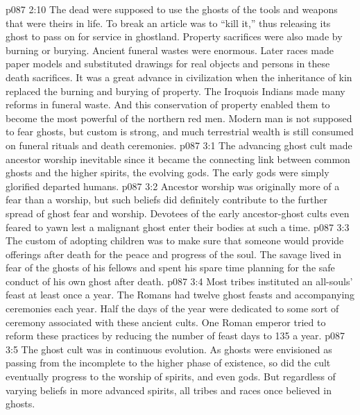 \vs p087 2:10 The dead were supposed to use the ghosts of the tools and weapons that were theirs in life. To break an article was to “kill it,” thus releasing its ghost to pass on for service in ghostland. Property sacrifices were also made by burning or burying. Ancient funeral wastes were enormous. Later races made paper models and substituted drawings for real objects and persons in these death sacrifices. It was a great advance in civilization when the inheritance of kin replaced the burning and burying of property. The Iroquois Indians made many reforms in funeral waste. And this conservation of property enabled them to become the most powerful of the northern red men. Modern man is not supposed to fear ghosts, but custom is strong, and much terrestrial wealth is still consumed on funeral rituals and death ceremonies.
\vs p087 3:1 The advancing ghost cult made ancestor worship inevitable since it became the connecting link between common ghosts and the higher spirits, the evolving gods. The early gods were simply glorified departed humans.
\vs p087 3:2 Ancestor worship was originally more of a fear than a worship, but such beliefs did definitely contribute to the further spread of ghost fear and worship. Devotees of the early ancestor\hyp{}ghost cults even feared to yawn lest a malignant ghost enter their bodies at such a time.
\vs p087 3:3 The custom of adopting children was to make sure that someone would provide offerings after death for the peace and progress of the soul. The savage lived in fear of the ghosts of his fellows and spent his spare time planning for the safe conduct of his own ghost after death.
\vs p087 3:4 Most tribes instituted an all\hyp{}souls’ feast at least once a year. The Romans had twelve ghost feasts and accompanying ceremonies each year. Half the days of the year were dedicated to some sort of ceremony associated with these ancient cults. One Roman emperor tried to reform these practices by reducing the number of feast days to 135 a year.
\vs p087 3:5 \pc The ghost cult was in continuous evolution. As ghosts were envisioned as passing from the incomplete to the higher phase of existence, so did the cult eventually progress to the worship of spirits, and even gods. But regardless of varying beliefs in more advanced spirits, all tribes and races once believed in ghosts.
